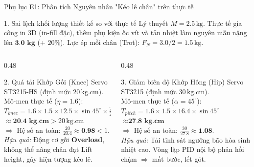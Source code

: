 \documentclass[10pt,aspectratio=169]{beamer}
\begin{document}
\begin{frame}{Phụ lục E1: Phân tích Nguyên nhân "Kéo lê chân" trên thực tế}
  \begin{block}{1. Sai lệch khối lượng thiết kế so với thực tế}
      Lý thuyết $M = 2.5\,\text{kg}$. Thực tế gia công in 3D (in-fill đặc), thêm phụ kiện ốc vít và tản nhiệt làm nguyên mẫu nặng lên $\textbf{3.0 kg}$ (+ $20\%$). Lực ép mỗi chân (Trot): $F_N = 3.0 / 2 = 1.5\,\text{kg}$.
  \end{block}
  \vspace{0.05cm}
  \begin{columns}[t]
      \begin{column}{0.48\textwidth}
          \begin{alertblock}{2. Quá tải Khớp Gối (Knee)}
              Servo ST3215-HS (định mức $20\,\text{kg.cm}$).\\
              Mô-men thực tế ($\eta=1.6$):\\
              $T_{knee} = 1.6 \times 1.5 \times 12.5 \times \sin45^\circ \times \frac{24}{25}$\\
              $\approx \textbf{20.4 kg.cm} > 20\,\text{kg.cm}$\\
              $\Rightarrow$ Hệ số an toàn: $\frac{20}{20.4} \approx \textbf{0.98} < 1$.\\
              \textit{Hậu quả:} Động cơ gối \textbf{Overload}, không thể nâng chân đạt Lift height, gây hiện tượng kéo lê.
          \end{alertblock}
      \end{column}
      \begin{column}{0.48\textwidth}
          \begin{alertblock}{3. Giảm biên độ Khớp Hông (Hip)}
              Servo ST3215 (định mức $30\,\text{kg.cm}$).\\
              Mô-men thực tế ($\alpha=45^\circ$):\\
              $T_{pitch} = 1.6 \times 1.5 \times 16.4 \times \sin45^\circ$\\
              $\approx \textbf{27.8 kg.cm}$\\
              $\Rightarrow$ Hệ số an toàn: $\frac{30}{27.8} \approx \textbf{1.08}$.\\
              \textit{Hậu quả:} Tải tĩnh sát ngưỡng bão hòa sinh nhiệt cao. Vòng lặp PID nội bộ phản hồi chậm $\Rightarrow$ mất bước, lết gót.
          \end{alertblock}
      \end{column}
  \end{columns}
\end{frame}
\end{document}
